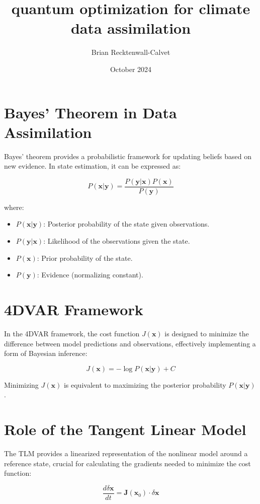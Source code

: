 \documentclass{article}
\title{quantum optimization for climate data assimilation}
\author{Brian Recktenwall-Calvet}
\date{October 2024}
\begin{document}
\maketitle

\section{Bayes' Theorem in Data Assimilation}

Bayes' theorem provides a probabilistic framework for updating beliefs based on new evidence. In state estimation, it can be expressed as:

\[
P(\mathbf{x} | \mathbf{y}) = \frac{P(\mathbf{y} | \mathbf{x}) P(\mathbf{x})}{P(\mathbf{y})}
\]

where:
\begin{itemize}
    \item \( P(\mathbf{x} | \mathbf{y}) \): Posterior probability of the state given observations.
    \item \( P(\mathbf{y} | \mathbf{x}) \): Likelihood of the observations given the state.
    \item \( P(\mathbf{x}) \): Prior probability of the state.
    \item \( P(\mathbf{y}) \): Evidence (normalizing constant).
\end{itemize}

\section{4DVAR Framework}

In the 4DVAR framework, the cost function \( J(\mathbf{x}) \) is designed to minimize the difference between model predictions and observations, effectively implementing a form of Bayesian inference:

\[
J(\mathbf{x}) = -\log P(\mathbf{x} | \mathbf{y}) + C
\]

Minimizing \( J(\mathbf{x}) \) is equivalent to maximizing the posterior probability \( P(\mathbf{x} | \mathbf{y}) \).

\section{Role of the Tangent Linear Model}

The TLM provides a linearized representation of the nonlinear model around a reference state, crucial for calculating the gradients needed to minimize the cost function:

\[
\frac{d \delta \mathbf{x}}{dt} = \mathbf{J}(\mathbf{x}_0) \cdot \delta \mathbf{x}
\]
\end{document}
